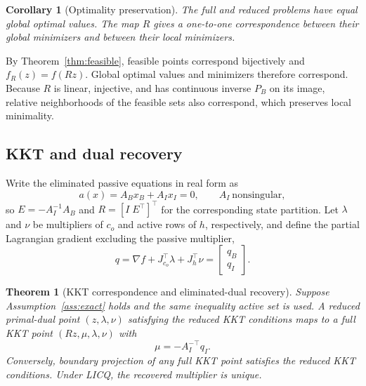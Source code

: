 \documentclass[journal,10pt]{IEEEtran}
\newtheorem{theorem}{Theorem}
\newtheorem{corollary}{Corollary}
\begin{document}
\begin{corollary}[Optimality preservation]\label{cor:optimal}
The full and reduced problems have equal global optimal values.  The map $R$
gives a one-to-one correspondence between their global minimizers and between
their local minimizers.
\end{corollary}

\begin{IEEEproof}
By Theorem~\ref{thm:feasible}, feasible points correspond bijectively and
$f_R(z)=f(Rz)$.  Global optimal values and minimizers therefore correspond.
Because $R$ is linear, injective, and has continuous inverse $P_B$ on its image,
relative neighborhoods of the feasible sets also correspond, which preserves
local minimality.
\end{IEEEproof}

\subsection{KKT and dual recovery}
Write the eliminated passive equations in real form as
\begin{equation}
 a(x)=A_Bx_B+A_Ix_I=0,\qquad A_I\ \text{nonsingular},
 \label{eq:passive_real}
\end{equation}
so $E=-A_I^{-1}A_B$ and $R=[I\;E^\top]^\top$ for the corresponding state
partition.  Let $\lambda$ and $\nu$ be multipliers of $c_o$ and active rows of
$h$, respectively, and define the partial Lagrangian gradient excluding the
passive multiplier,
\begin{equation}
 q=\nabla f+J_{c_o}^{\top}\lambda+J_h^{\top}\nu
   =\begin{bmatrix}q_B\\q_I\end{bmatrix}.
\end{equation}

\begin{theorem}[KKT correspondence and eliminated-dual recovery]
\label{thm:kkt}
Suppose Assumption~\ref{ass:exact} holds and the same inequality active set is
used.  A reduced primal-dual point $(z,\lambda,\nu)$ satisfying the reduced KKT
conditions maps to a full KKT point $(Rz,\mu,\lambda,\nu)$ with
\begin{equation}
 \boxed{\mu=-A_I^{-\top}q_I}.                       \label{eq:dual_recovery}
\end{equation}
Conversely, boundary projection of any full KKT point satisfies the reduced KKT
conditions.  Under LICQ, the recovered multiplier is unique.
\end{theorem}
\end{document}
